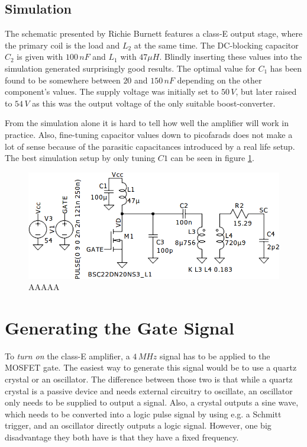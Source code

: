 \subsection{Simulation}

The schematic presented by Richie Burnett features a class-E output stage, where the primary coil is the load and \(L_2\) at the same time. The DC-blocking capacitor \(C_2\) is given with \(100\,nF\) and \(L_1\) with \(47\mu H\). Blindly inserting these values into the simulation generated surprisingly good results. The optimal value for \(C_1\) has been found to be somewhere between \(20\) and \(150\,nF\) depending on the other component's values. The supply voltage was initially set to \(50\,V\), but later raised to \(54\,V\) as this was the output voltage of the only suitable boost-converter.

From the simulation alone it is hard to tell how well the amplifier will work in practice. Also, fine-tuning capacitor values down to picofarads does not make a lot of sense because of the parasitic capacitances introduced by a real life setup. The best simulation setup by only tuning \(C1\) can be seen in figure \ref{fig:ltspice-complete}.

\begin{figure}[h!]
    \centering
    \includegraphics[width=\textwidth]{simon/resources/ltspice-complete.png}
    \caption{AAAAA}
    \label{fig:ltspice-complete}
\end{figure}

\section{Generating the Gate Signal} %

To \emph{turn on} the class-E amplifier, a \(4\,MHz\) signal has to be applied to the MOSFET gate. The easiest way to generate this signal would be to use a quartz crystal or an oscillator. The difference between those two is that while a quartz crystal is a passive device and needs external circuitry to oscillate, an oscillator only needs to be supplied to output a signal. Also, a crystal outputs a sine wave, which needs to be converted into a logic pulse signal by using e.g. a Schmitt trigger, and an oscillator directly outputs a logic signal. However, one big disadvantage they both have is that they have a fixed frequency.

